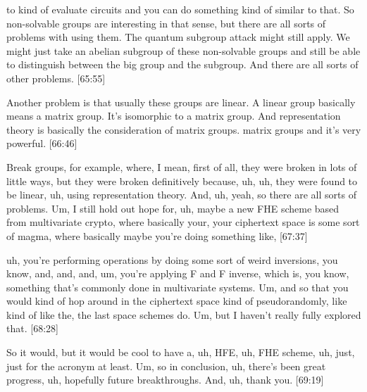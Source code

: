 \documentclass[11pt,a4paper]{article}
\newcommand{\timestamp}[1]{%
  \hfill{\scriptsize\color{gray}[#1]}%
}
\begin{document}
to kind of evaluate circuits and you can do something kind of similar to that. So non-solvable groups are interesting in that sense, but there are all sorts of problems with using them. The quantum subgroup attack might still apply. We might just take an abelian subgroup of these non-solvable groups and still be able to distinguish between the big group and the subgroup. And there are all sorts of other problems. \timestamp{65:55}

Another problem is that usually these groups are linear. A linear group basically means a matrix group. It's isomorphic to a matrix group. And representation theory is basically the consideration of matrix groups. matrix groups and it's very powerful. \timestamp{66:46}

Break groups, for example, where, I mean, first of all, they were broken in lots of little ways, but they were broken definitively because, uh, uh, they were found to be linear, uh, using representation theory. And, uh, yeah, so there are all sorts of problems. Um, I still hold out hope for, uh, maybe a new FHE scheme based from multivariate crypto, where basically your, your ciphertext space is some sort of magma, where basically maybe you're doing something like, \timestamp{67:37}

uh, you're performing operations by doing some sort of weird inversions, you know, and, and, and, um, you're applying F and F inverse, which is, you know, something that's commonly done in multivariate systems. Um, and so that you would kind of hop around in the ciphertext space kind of pseudorandomly, like kind of like the, the last space schemes do. Um, but I haven't really fully explored that. \timestamp{68:28}

So it would, but it would be cool to have a, uh, HFE, uh, FHE scheme, uh, just, just for the acronym at least. Um, so in conclusion, uh, there's been great progress, uh, hopefully future breakthroughs. And, uh, thank you. \timestamp{69:19}
\end{document}
